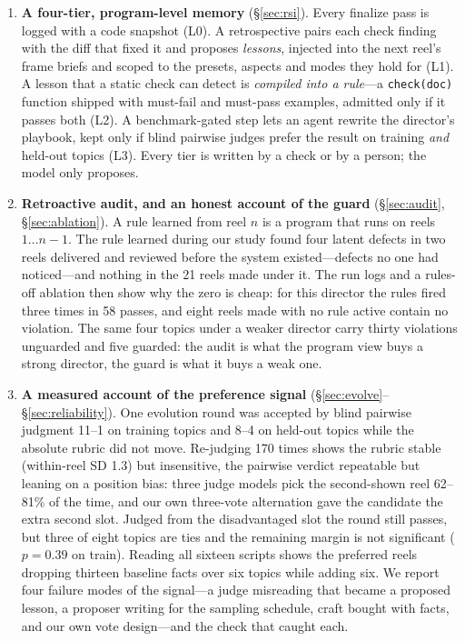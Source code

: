 \documentclass[11pt]{article}
\begin{document}
\begin{enumerate}
\item \textbf{A four-tier, program-level memory} (\S\ref{sec:rsi}). Every finalize pass is logged
  with a code snapshot (L0). A retrospective pairs each check finding with the diff that fixed it
  and proposes \emph{lessons}, injected into the next reel's frame briefs and scoped to the presets,
  aspects and modes they hold for (L1). A lesson that a static check can detect is \emph{compiled
  into a rule}---a \texttt{check(doc)} function shipped with must-fail and must-pass examples,
  admitted only if it passes both (L2). A benchmark-gated step lets an agent rewrite the director's
  playbook, kept only if blind pairwise judges prefer the result on training \emph{and} held-out
  topics (L3). Every tier is written by a check or by a person; the model only proposes.
\item \textbf{Retroactive audit, and an honest account of the guard} (\S\ref{sec:audit},
  \S\ref{sec:ablation}). A rule learned from reel $n$ is a program that runs on reels $1 \ldots n-1$.
  The rule learned during our study found four latent defects in two reels delivered and reviewed
  before the system existed---defects no one had noticed---and nothing in the 21 reels made under it.
  The run logs and a rules-off ablation then show why the zero is cheap: for this director the rules
  fired three times in 58 passes, and eight reels made with no rule active contain no violation. The
  same four topics under a weaker director carry thirty violations unguarded and five guarded: the
  audit is what the program view buys a strong director, the guard is what it buys a weak one.
\item \textbf{A measured account of the preference signal} (\S\ref{sec:evolve}--\S\ref{sec:reliability}).
  One evolution round was accepted by blind pairwise judgment 11--1 on training topics and 8--4 on
  held-out topics while the absolute rubric did not move. Re-judging 170 times shows the rubric stable
  (within-reel SD 1.3) but insensitive, the pairwise verdict repeatable but leaning on a position bias:
  three judge models pick the second-shown reel 62--81\% of the time, and our own three-vote
  alternation gave the candidate the extra second slot. Judged from the disadvantaged slot the round still passes, but three of eight topics are ties and
  the remaining margin is not significant ($p=0.39$ on train). Reading all sixteen scripts shows the preferred reels dropping
  thirteen baseline facts over six topics while adding six. We report four failure modes of the
  signal---a judge misreading that became a proposed lesson, a proposer writing for the sampling
  schedule, craft bought with facts, and our own vote design---and the check that caught each.
\end{enumerate}
\end{document}
